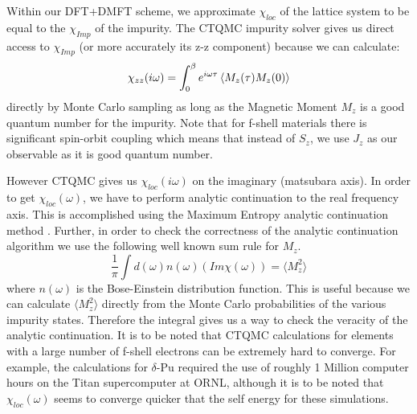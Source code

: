 \documentclass[10pt]{ruthesis}
\begin{document}
{Within our DFT+DMFT scheme, we approximate $\chi_{loc}$ of the lattice system to be equal to the $\chi_{Imp}$ of the impurity. The CTQMC impurity solver gives us  direct access to $\chi_{Imp}$ (or more accurately its z-z component) because we can calculate:
\begin{equation}
\chi_{zz}(i\omega)=\int_0^\beta e^{i\omega\tau} \braket{ M_z(\tau)  M_z(0)} 
\end{equation}
directly by Monte Carlo sampling as long as the Magnetic Moment $M_z$ is a good quantum number for the impurity. Note that for f-shell materials there is significant spin-orbit coupling which means that instead of $S_z$, we use $J_z$ as our observable as it is good quantum number. 

However CTQMC gives us $\chi_{loc}(i \omega)$ on the imaginary (matsubara axis). In order to get $\chi_{loc}(\omega)$, we have to perform analytic continuation to the real frequency axis. This is accomplished using the Maximum Entropy analytic continuation method  \cite{PhysicsReports_MEM_1996_M.Jarrell}. Further, in order to check the correctness of the analytic continuation algorithm we use the following well known sum rule for $M_z$.
\begin{equation}\label{sum rule}
\dfrac{1}{\pi}\int d(\omega) n(\omega) (Im \chi(\omega))= \langle M_{z}^{2} \rangle
\end{equation}
where $n(\omega)$ is the Bose-Einstein distribution function. This is useful because we can calculate $\langle M_{z}^{2} \rangle$ directly from the Monte Carlo probabilities of the various impurity states. Therefore the integral gives us a way to check the veracity of the analytic continuation. It is to be noted that CTQMC calculations for elements with a large number of f-shell electrons can be extremely hard to converge. For example, the calculations for $\delta$-Pu required the use of roughly 1 Million computer hours on the Titan supercomputer at ORNL, although it is to be noted that $\chi_{loc}(\omega)$ seems to converge quicker that the self energy for these simulations.

}
\end{document}
